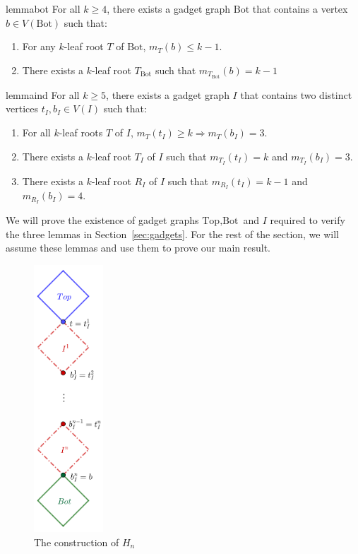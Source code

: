 \documentclass[11pt,letter]{article}
\theoremstyle{remark}
\newcommand{\T}{\text{Top}}
\newcommand{\B}{\text{Bot}}
\begin{document}
\begin{restatable}{lemma}{bot}\label{lem:bottom}
For all $k\geq 4$, there exists a gadget graph $\B$ that contains a vertex $b \in V(\B)$ such that:
\begin{enumerate}
        \item For any $k$-leaf root $T$ of $\B$, $m_T(b) \leq k-1$.
        \item There exists a $k$-leaf root $T_{\B}$ such that $m_{T_{\B}}(b) = k-1$
\end{enumerate}
\end{restatable}   
\begin{restatable}{lemma}{ind}\label{lem:induction}
For all $k\geq 5$, there exists a gadget graph $I$ that contains two distinct vertices $t_I,b_I\in V(I)$ such that:
\begin{enumerate}
        \item For all $k$-leaf roots $T$ of $I$, $m_T(t_I)\geq k\Longrightarrow m_T(b_I)=3$.
        \item There exists a $k$-leaf root $T_I$ of $I$ such that $m_{T_I}(t_I)=k$ and $m_{T_I}(b_I)=3$.
        \item There exists a $k$-leaf root $R_I$ of $I$ such that $m_{R_I}(t_I)=k-1$ and $m_{R_I}(b_I)=4$.
    \end{enumerate}    
\end{restatable}

We will prove the existence of gadget graphs
$\T, \B$ and $I$ required to verify the three lemmas in Section~\ref{sec:gadgets}.
For the rest of the section, we will assume these lemmas and use them to prove our main result.

\begin{figure}[h!]
    \centering
    \includegraphics[height=10cm]{ConstructionHn.png}
    \caption{The construction of $H_n$}\label{fig:Hn}
\end{figure}
\end{document}
